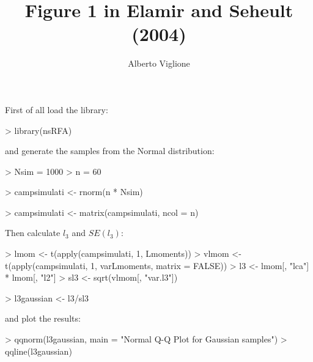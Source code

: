 \documentclass[a4paper]{article}
\title{Figure 1 in Elamir and Seheult (2004)}
\author{Alberto Viglione}
\begin{document}
\maketitle




First of all load the library:
\begin{Schunk}
\begin{Sinput}
> library(nsRFA)
\end{Sinput}
\end{Schunk}
and generate the samples from the Normal distribution:
\begin{Schunk}
\begin{Sinput}
> Nsim = 1000
> n = 60
\end{Sinput}
\end{Schunk}
\begin{Schunk}
\begin{Sinput}
> campsimulati <- rnorm(n * Nsim)
\end{Sinput}
\end{Schunk}
\begin{Schunk}
\begin{Sinput}
> campsimulati <- matrix(campsimulati, ncol = n)
\end{Sinput}
\end{Schunk}
Then calculate $l_3$ and $SE(l_3)$:
\begin{Schunk}
\begin{Sinput}
> lmom <- t(apply(campsimulati, 1, Lmoments))
> vlmom <- t(apply(campsimulati, 1, varLmoments, matrix = FALSE))
> l3 <- lmom[, "lca"] * lmom[, "l2"]
> sl3 <- sqrt(vlmom[, "var.l3"])
\end{Sinput}
\end{Schunk}
\begin{Schunk}
\begin{Sinput}
> l3gaussian <- l3/sl3
\end{Sinput}
\end{Schunk}
and plot the results:
\begin{Schunk}
\begin{Sinput}
> qqnorm(l3gaussian, main = "Normal Q-Q Plot for Gaussian samples")
> qqline(l3gaussian)
\end{Sinput}
\end{Schunk}
\end{document}
